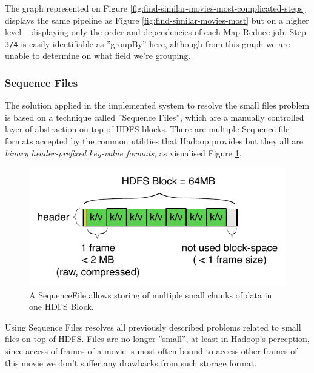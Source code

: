 The graph represented on Figure \ref{fig:find-similar-movies-most-complicated-steps} displays the same pipeline as Figure \ref{fig:find-similar-movies-most} but on a higher level -- displaying only the order and dependencies of each Map Reduce job. Step \verb|3/4| is easily identifiable as ''groupBy'' here, although from this graph we are unable to determine on what field we're grouping.



\subsubsection{Sequence Files}
\label{sequence-file}
The solution applied in the implemented system to resolve the small files problem is based on a technique called ''Sequence Files'', which are a manually controlled layer of abstraction on top of HDFS blocks. There are multiple Sequence file formats accepted by the common utilities that Hadoop provides \cite{hadoop-seq-files} but they all are \textit{binary header-prefixed key-value formats}, as visualised Figure \ref{fig:sequence-file}.


\begin{figure}[ch!]
  \centering
  \includegraphics[scale=0.9]{diagrams/sequence-file.pdf}
  \caption{A SequenceFile allows storing of multiple small chunks of data in one HDFS Block.}
  \label{fig:sequence-file}
\end{figure}

Using Sequence Files resolves all previously described problems related to small files on top of HDFS. Files are no longer ''small'', at least in Hadoop's perception,
since access of frames of a movie is most often bound to access other frames of this movie we don't suffer any drawbacks from such storage format.

